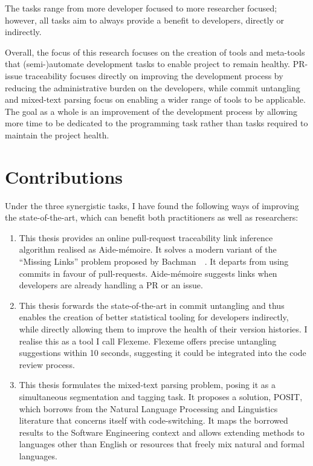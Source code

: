 \noindent The tasks range from more developer focused to more researcher
focused; however, all tasks aim to always provide a benefit to developers,
directly or indirectly.

Overall, the focus of this research focuses on the creation of tools and
meta-tools that (semi-)automate development tasks to enable project to remain
healthy. PR-issue traceability focuses directly on improving the development
process by reducing the administrative burden on the developers, while commit
untangling and mixed-text parsing focus on enabling a wider range of tools to be
applicable. The goal as a whole is an improvement of the development process by
allowing more time to be dedicated to the programming task rather than tasks
required to maintain the project health.

\section{Contributions}
\label{chapter:introduction:sec:contrib}

Under the three synergistic tasks, I have found the following ways of improving
the state-of-the-art, which can benefit both practitioners as well as
researchers:

\begin{enumerate}
    \item This thesis provides an online pull-request traceability link
    inference algorithm realised as Aide-mémoire. It solves a modern variant of
    the ``Missing Links'' problem proposed by Bachman~\etal~\cite{MissingLinks}.
    It departs from using commits in favour of pull-requests. Aide-mémoire
    suggests links when developers are already handling a PR or an issue.
    \item This thesis forwards the state-of-the-art in commit
    untangling and thus enables the creation of better statistical tooling for
    developers indirectly, while directly allowing them to improve the health of
    their version histories. I realise this as a tool I call Flexeme. Flexeme
    offers precise untangling suggestions within 10 seconds, suggesting it could
    be integrated into the code review process.
    \item This thesis formulates the mixed-text parsing problem, posing it as a
    simultaneous segmentation and tagging task. It proposes a solution, POSIT,
    which borrows from the Natural Language Processing and Linguistics
    literature that concerns itself with code-switching. It maps the borrowed
    results to the Software Engineering context and allows extending methods to
    languages other than English or resources that freely mix natural and formal
    languages.
\end{enumerate}


